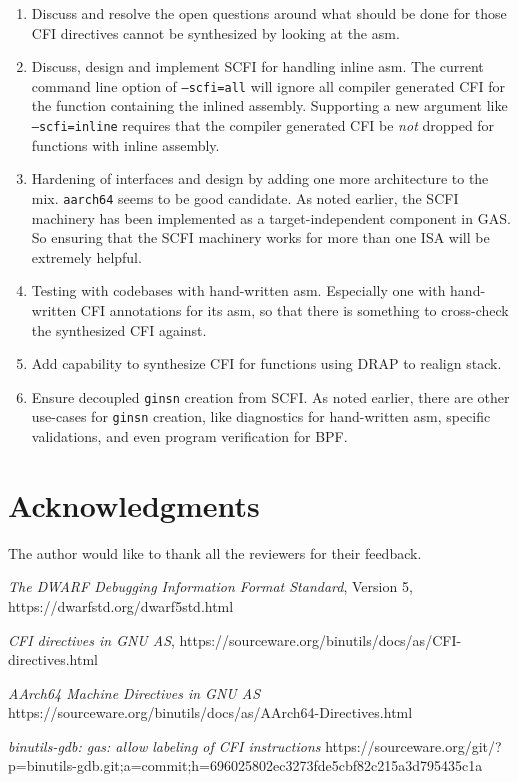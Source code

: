 \documentclass{article} \usepackage[a4paper, total={6in, 8in}]{geometry}
\begin{document}
\begin{enumerate}

\item Discuss and resolve the open questions around what should be done for
those CFI directives cannot be synthesized by looking at the asm.

\item Discuss, design and implement SCFI for handling inline asm. The current
command line option of \texttt{--scfi=all} will ignore all compiler generated
CFI for the function containing the inlined assembly.  Supporting a new
argument like \texttt{--scfi=inline} requires that the compiler generated CFI
be \emph{not} dropped for functions with inline assembly.

\item Hardening of interfaces and design by adding one more architecture to the
mix.  \texttt{aarch64} seems to be good candidate.  As noted earlier, the SCFI
machinery has been implemented as a target-independent component in GAS.  So
ensuring that the SCFI machinery works for more than one ISA will be extremely
helpful.

\item Testing with codebases with hand-written asm.  Especially one with
hand-written CFI annotations for its asm, so that there is something to
cross-check the synthesized CFI against.

\item Add capability to synthesize CFI for functions using DRAP to
realign stack.

\item Ensure decoupled \texttt{ginsn} creation from SCFI.  As noted
earlier, there are other use-cases for \texttt{ginsn} creation, like
diagnostics for hand-written asm, specific validations, and even program
verification for BPF.

\end{enumerate}

\section*{Acknowledgments} The author would like to thank all the
reviewers for their feedback.

\begin{thebibliography}{9}

 \emph{The DWARF Debugging Information Format Standard},
Version 5, https://dwarfstd.org/dwarf5std.html

 \emph{CFI directives in GNU AS},
  https://sourceware.org/binutils/docs/as/CFI-directives.html

 \emph{AArch64 Machine Directives in GNU AS}
https://sourceware.org/binutils/docs/as/AArch64-Directives.html

 \emph{binutils-gdb: gas: allow labeling of CFI
    instructions}
    https://sourceware.org/git/?p=binutils-gdb.git;a=commit;h=696025802ec3273fde5cbf82c215a3d795435c1a

\end{thebibliography}
\end{document}
